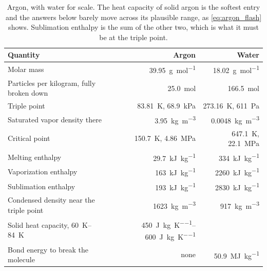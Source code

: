 \documentclass{article}
\begin{document}
\begin{table}[!htpb]
    \centering
    \caption{Argon, with water for scale. The heat capacity of solid argon is the softest entry and the answers below barely move across its plausible range, as \autoref{eq:argon_flash} shows. Sublimation enthalpy is the sum of the other two, which is what it must be at the triple point.}
    \label{tab:argon_properties}
    \begin{tabular}{|l|r|r|}\hline
        \textbf{Quantity} & \textbf{Argon} & \textbf{Water} \\\hline
        Molar mass & \SI{39.95}{\gram\per\mole} & \SI{18.02}{\gram\per\mole} \\\hline
        Particles per kilogram, fully broken down & \SI{25.0}{\mole} & \SI{166.5}{\mole} \\\hline
        Triple point & \SI{83.81}{\kelvin}, \SI{68.9}{\kilo\pascal} & \SI{273.16}{\kelvin}, \SI{611}{\pascal} \\\hline
        Saturated vapor density there & \SI{3.95}{\kilogram\per\cubic\meter} & \SI{0.0048}{\kilogram\per\cubic\meter} \\\hline
        Critical point & \SI{150.7}{\kelvin}, \SI{4.86}{\mega\pascal} & \SI{647.1}{\kelvin}, \SI{22.1}{\mega\pascal} \\\hline
        Melting enthalpy & \SI{29.7}{\kilo\joule\per\kilogram} & \SI{334}{\kilo\joule\per\kilogram} \\\hline
        Vaporization enthalpy & \SI{163}{\kilo\joule\per\kilogram} & \SI{2260}{\kilo\joule\per\kilogram} \\\hline
        Sublimation enthalpy & \SI{193}{\kilo\joule\per\kilogram} & \SI{2830}{\kilo\joule\per\kilogram} \\\hline
        Condensed density near the triple point & \SI{1623}{\kilogram\per\cubic\meter} & \SI{917}{\kilogram\per\cubic\meter} \\\hline
        Solid heat capacity, \SIrange{60}{84}{\kelvin} & \SIrange{450}{600}{\joule\per\kilogram\per\kelvin} & \\\hline
        Bond energy to break the molecule & none & \SI{50.9}{\mega\joule\per\kilogram} \\\hline
    \end{tabular}
\end{table}
\end{document}
